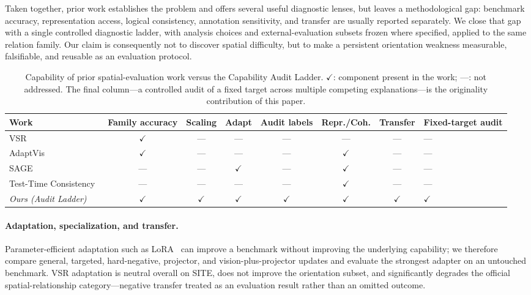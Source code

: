 \documentclass[10pt,twocolumn,letterpaper]{article}
\begin{document}
Taken together, prior work establishes the problem and offers several useful diagnostic lenses, but leaves a methodological gap: benchmark accuracy, representation access, logical consistency, annotation sensitivity, and transfer are usually reported separately. We close that gap with a single controlled diagnostic ladder, with analysis choices and external-evaluation subsets frozen where specified, applied to the same relation family. Our claim is consequently not to discover spatial difficulty, but to make a persistent orientation weakness measurable, falsifiable, and reusable as an evaluation protocol.

\begin{table}[t]
\centering
\footnotesize
\caption{Capability of prior spatial-evaluation work versus the Capability Audit Ladder. $\checkmark$: component present in the work; ---: not addressed. The final column---a controlled audit of a fixed target across multiple competing explanations---is the originality contribution of this paper.}
\label{tab:related-matrix}
\begin{tabular}{@{}lcccccc@{}}
\toprule
Work & Family accuracy & Scaling & Adapt & Audit labels & Repr./Coh. & Transfer & Fixed-target audit \\
\midrule
VSR~\cite{liu2023vsr} & $\checkmark$ & --- & --- & --- & --- & --- & --- \\
AdaptVis~\cite{chen2025adaptvis} & $\checkmark$ & --- & --- & --- & $\checkmark$ & --- & --- \\
SAGE~\cite{liu2026sage} & --- & --- & $\checkmark$ & --- & $\checkmark$ & --- & --- \\
Test-Time Consistency~\cite{testsime2026consistency} & --- & --- & --- & --- & $\checkmark$ & --- & --- \\
\emph{Ours (Audit Ladder)} & $\checkmark$ & $\checkmark$ & $\checkmark$ & $\checkmark$ & $\checkmark$ & $\checkmark$ & $\checkmark$ \\
\bottomrule
\end{tabular}
\end{table}

\paragraph{Adaptation, specialization, and transfer.}
Parameter-efficient adaptation such as LoRA~\cite{hu2021lora} can improve a benchmark without improving the underlying capability; we therefore compare general, targeted, hard-negative, projector, and vision-plus-projector updates and evaluate the strongest adapter on an untouched benchmark. VSR adaptation is neutral overall on SITE, does not improve the orientation subset, and significantly degrades the official spatial-relationship category---negative transfer treated as an evaluation result rather than an omitted outcome.
\end{document}
